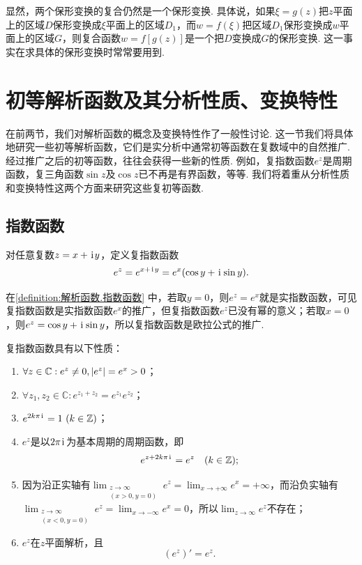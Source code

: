 显然，两个保形变换的复合仍然是一个保形变换.
具体说，如果\(\xi = g(z)\)把\(z\)平面上的区域\(D\)保形变换成\(\xi\)平面上的区域\(D_1\)，而\(w = f(\xi)\)把区域\(D_1\)保形变换成\(w\)平面上的区域\(G\)，则复合函数\(w = f[g(z)]\)是一个把\(D\)变换成\(G\)的保形变换.
这一事实在求具体的保形变换时常常要用到.

\section{初等解析函数及其分析性质、变换特性}
在前两节，我们对解析函数的概念及变换特性作了一般性讨论.
这一节我们将具体地研究一些初等解析函数，它们是实分析中通常初等函数在复数域中的自然推广.
经过推广之后的初等函数，往往会获得一些新的性质.
例如，复指数函数\(e^z\)是周期函数，复三角函数\(\sin z\)及\(\cos z\)已不再是有界函数，等等.
我们将着重从分析性质和变换特性这两个方面来研究这些复初等函数.

\subsection{指数函数}
\begin{definition}\label{definition:解析函数.指数函数}
对任意复数\(z=x+\kern1pt\mathrm{i}\kern1pt y\)，定义复指数函数\begin{equation}
e^z = e^{x+\kern1pt\mathrm{i}\kern1pt y} = e^x(\cos y + \kern1pt\mathrm{i}\kern1pt \sin y).
\end{equation}
\end{definition}

在\cref{definition:解析函数.指数函数} 中，若取\(y = 0\)，则\(e^z = e^x\)就是实指数函数，可见复指数函数是实指数函数\(e^x\)的推广，但复指数函数\(e^z\)已没有幂的意义；若取\(x = 0\)，则\(e^z = \cos y + \kern1pt\mathrm{i}\kern1pt \sin y\)，所以复指数函数是欧拉公式的推广.

\begin{property}
复指数函数具有以下性质：
\begin{enumerate}
\item \(\forall z\in\mathbb{C} : e^z \neq 0, \abs{e^z} = e^x > 0\)；
\item \(\forall z_1,z_2\in\mathbb{C} : e^{z_1+z_2} = e^{z_1}e^{z_2}\)；
\item \(e^{2k\pi\iu} = 1\ (k\in\mathbb{Z})\)；
\item \(e^z\)是以\(2\pi\kern1pt\mathrm{i}\kern1pt\)为基本周期的周期函数，即\begin{equation*}
e^{z + 2k\pi\kern1pt\mathrm{i}\kern1pt} = e^z \quad (k\in\mathbb{Z});
\end{equation*}
\item 因为沿正实轴有\(\lim_{\substack{z\to\infty \\ (x>0,y=0)}} e^z = \lim_{x\to+\infty} e^x = +\infty\)，而沿负实轴有\(\lim_{\substack{z\to\infty \\ (x<0,y=0)}} e^z = \lim_{x\to-\infty} e^x = 0\)，所以\(\lim_{z\to\infty} e^z\)不存在；
\item \(e^z\)在\(z\)平面解析，且\begin{equation}\label{equation:解析函数.指数函数的导数}
(e^z)'=e^z.
\end{equation}
\end{enumerate}
\end{property}

